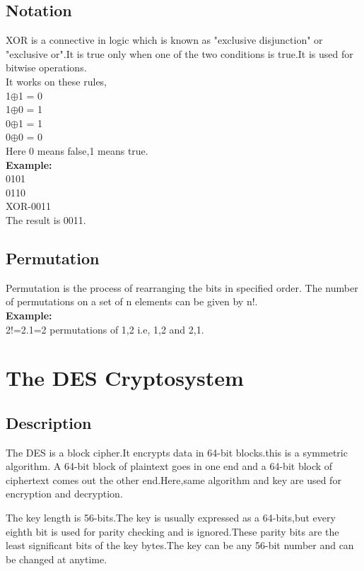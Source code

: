 \documentclass[11pt]{article}
\begin{document}
\subsection{Notation}

\quad\quad XOR is a connective in logic which is known as "exclusive disjunction" or "exclusive or".It is true only when one of the two conditions is true.It is used for bitwise operations.\\
  It works on these rules,\\
  1$\oplus$1 = 0\\
  1$\oplus$0 = 1\\
  0$\oplus$1 = 1\\
  0$\oplus$0 = 0\\
 Here 0 means false,1 means true.\\
{\bf Example:}\\
    0101\\
    0110\\
XOR-0011\\
The result is 0011.

\subsection{Permutation}

\quad\quad Permutation is the process of rearranging the bits in specified order.
The number of permutations on a set of n elements can be given by n!.\\
{\bf Example:}\\
2!=2.1=2 permutations of {1,2} i.e, {1,2} and {2,1}.

\section{The DES Cryptosystem}
\subsection{Description}
\qquad\quad The DES is a block cipher.It encrypts data in 64-bit blocks.this is a symmetric algorithm.
A 64-bit block of plaintext goes in one end and a 64-bit block of ciphertext comes out the other end.Here,same algorithm and key are used for encryption and decryption.

\quad\quad The key length is 56-bits.The key is usually expressed as a 64-bits,but every eighth bit is used for parity checking and is ignored.These parity bits are the least significant bits 
of the key bytes.The key can be any 56-bit number and can be changed at anytime.
\end{document}
